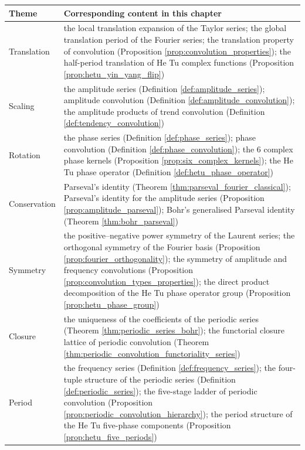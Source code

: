\begingroup
\renewcommand{\arraystretch}{1.3}
\begin{longtable}{>{\raggedright\arraybackslash}p{3cm}>{\raggedright\arraybackslash}p{10.5cm}}
\toprule
Theme & Corresponding content in this chapter \\
\midrule
Translation & the local translation expansion of the Taylor series; the global translation period of the Fourier series; the translation property of convolution (Proposition \ref{prop:convolution_properties}); the half-period translation of He Tu complex functions (Proposition \ref{prop:hetu_yin_yang_flip}) \\
Scaling & the amplitude series (Definition \ref{def:amplitude_series}); amplitude convolution (Definition \ref{def:amplitude_convolution}); the amplitude products of trend convolution (Definition \ref{def:tendency_convolution}) \\
Rotation & the phase series (Definition \ref{def:phase_series}); phase convolution (Definition \ref{def:phase_convolution}); the 6 complex phase kernels (Proposition \ref{prop:six_complex_kernels}); the He Tu phase operator (Definition \ref{def:hetu_phase_operator}) \\
Conservation & Parseval's identity (Theorem \ref{thm:parseval_fourier_classical}); Parseval's identity for the amplitude series (Proposition \ref{prop:amplitude_parseval}); Bohr's generalised Parseval identity (Theorem \ref{thm:bohr_parseval}) \\
Symmetry & the positive--negative power symmetry of the Laurent series; the orthogonal symmetry of the Fourier basis (Proposition \ref{prop:fourier_orthogonality}); the symmetry of amplitude and frequency convolutions (Proposition \ref{prop:convolution_types_properties}); the direct product decomposition of the He Tu phase operator group (Proposition \ref{prop:hetu_phase_group}) \\
Closure & the uniqueness of the coefficients of the periodic series (Theorem \ref{thm:periodic_series_bohr}); the functorial closure lattice of periodic convolution (Theorem \ref{thm:periodic_convolution_functoriality_series}) \\
Period & the frequency series (Definition \ref{def:frequency_series}); the four-tuple structure of the periodic series (Definition \ref{def:periodic_series}); the five-stage ladder of periodic convolution (Proposition \ref{prop:periodic_convolution_hierarchy}); the period structure of the He Tu five-phase components (Proposition \ref{prop:hetu_five_periods}) \\
\bottomrule
\end{longtable}
\endgroup

